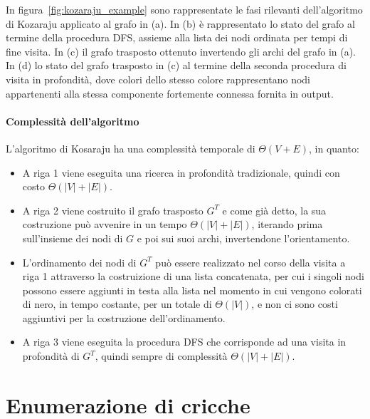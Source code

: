In figura~\ref{fig:kozaraju_example} sono rappresentate le fasi rilevanti dell'algoritmo di Kozaraju
applicato al grafo in (a).
In (b) \`e rappresentato lo stato del grafo al termine della procedura DFS, assieme alla lista dei nodi ordinata
per tempi di fine visita.
In (c) il grafo trasposto ottenuto invertendo gli archi del grafo in (a).
In (d) lo stato del grafo trasposto in (c) al termine della seconda procedura di visita in
profondit\`a, dove colori dello stesso colore rappresentano nodi appartenenti alla stessa componente fortemente
connessa fornita in output.

\paragraph{Complessit\`a dell'algoritmo}
L'algoritmo di Kosaraju ha una complessit\`a temporale di $\Theta(V + E)$, in quanto:
\begin{itemize}
    \item A riga 1 viene eseguita una ricerca in profondit\`a tradizionale, quindi con costo $\Theta(|V| + |E|)$.
    \item A riga 2 viene costruito il grafo trasposto $G^T$ e come gi\`a detto, la sua costruzione pu\`o avvenire in
    un tempo $\Theta(|V| + |E|)$, iterando prima sull'insieme dei nodi di $G$ e poi sui suoi archi, invertendone
    l'orientamento.
    \item L'ordinamento dei nodi di $G^T$ pu\`o essere realizzato nel corso della visita a riga 1 attraverso la
    costruizione di una lista concatenata, per cui i singoli nodi possono essere aggiunti in testa alla lista nel
    momento in cui vengono colorati di nero, in tempo costante, per un totale di $\Theta(|V|)$, e non ci sono costi
    aggiuntivi per la costruzione dell'ordinamento.
    \item A riga 3 viene eseguita la procedura DFS che corrisponde ad una visita in profondit\`a di $G^T$, quindi
    sempre di complessit\`a $\Theta(|V| + |E|)$.
\end{itemize}

\section{Enumerazione di cricche}\label{sec:enumerazione-di-cricche}

